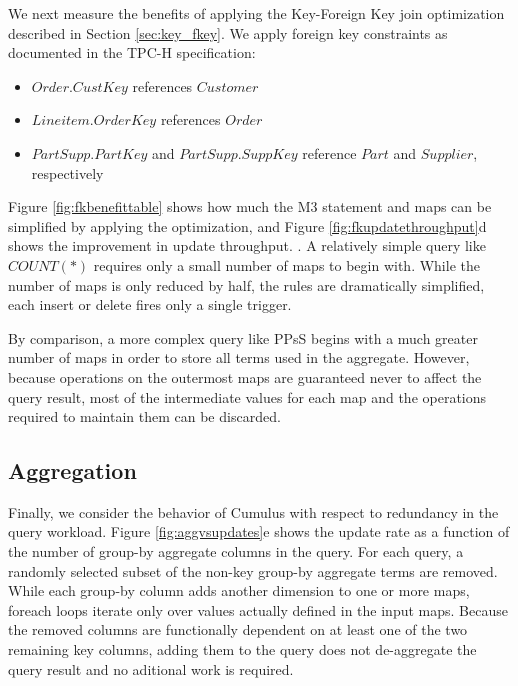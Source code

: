 We next measure the benefits of applying the Key-Foreign Key join optimization described in Section \ref{sec:key_fkey}.  We apply foreign key constraints as documented in the TPC-H specification: 
\begin{itemize}
\item $Order.CustKey$ references $Customer$
\item $Lineitem.OrderKey$ references $Order$
\item $PartSupp.PartKey$ and $PartSupp.SuppKey$ reference $Part$ and $Supplier$, respectively

\end{itemize}

Figure \ref{fig:fkbenefittable} shows how much the M3 statement and maps can be simplified by applying the optimization, and Figure \ref{fig:fkupdatethroughput}d shows the improvement in update throughput.  .  A relatively simple query like $COUNT(*)$ requires only a small number of maps to begin with.  While the number of maps is only reduced by half, the rules are dramatically simplified, each insert or delete fires only a single trigger.

By comparison, a more complex query like PPsS begins with a much greater number of maps in order to store all terms used in the aggregate.  However, because operations on the outermost maps are guaranteed never to affect the query result, most of the intermediate values for each map and the operations required to maintain them can be discarded.

\subsection{Aggregation}

Finally, we consider the behavior of Cumulus with respect to redundancy in the query workload.  Figure \ref{fig:aggvsupdates}e shows the update rate as a function of the number of group-by aggregate columns in the query.  For each query, a randomly selected subset of the non-key group-by aggregate terms are removed.  While each group-by column adds another dimension to one or more maps, foreach loops iterate only over values actually defined in the input maps.  Because the removed columns are functionally dependent on at least one of the two remaining key columns, adding them to the query does not de-aggregate the query result and no aditional work is required.

